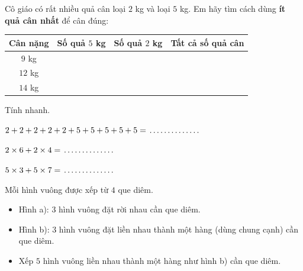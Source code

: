 \documentclass[../main.tex]{subfiles}
\begin{document}
\begin{bt}
    Cô giáo có rất nhiều quả cân loại $2$ kg và loại $5$ kg. Em hãy tìm cách dùng \textbf{ít quả cân nhất} để cân đúng:
    \TTbatdauhinh
    {\centering
    \par}
    \par\smallskip
    {\renewcommand{\arraystretch}{1.7}\noindent\hspace*{0.45cm}\begin{tabular}{|c|c|c|c|}
        \hline
        \textbf{Cân nặng} & \textbf{Số quả $5$ kg} & \textbf{Số quả $2$ kg} & \textbf{Tất cả số quả cân} \\
        \hline
        $9$ kg & & & \\
        \hline
        $12$ kg & & & \\
        \hline
        $14$ kg & & & \\
        \hline
    \end{tabular}}
\end{bt}

\begin{bt}
    Tính nhanh.
    \begin{listEX}
        \item $2+2+2+2+2+5+5+5+5+5=\TTcham[2.2cm]$
        \item $2\times6+2\times4=\TTcham[2.2cm]$
        \item $5\times3+5\times7=\TTcham[2.2cm]$
    \end{listEX}
\end{bt}

\begin{bt}
    Mỗi hình vuông được xếp từ $4$ que diêm.
    \TTbatdauhinh
    {\centering
    \par}
    \begin{itemize}
        \item Hình a): $3$ hình vuông đặt rời nhau cần \TTcham[1.2cm] que diêm.
        \item Hình b): $3$ hình vuông đặt liền nhau thành một hàng (dùng chung cạnh) cần \TTcham[1.2cm] que diêm.
        \item Xếp $5$ hình vuông liền nhau thành một hàng như hình b) cần \TTcham[1.2cm] que diêm.
    \end{itemize}
\end{bt}
\end{document}
